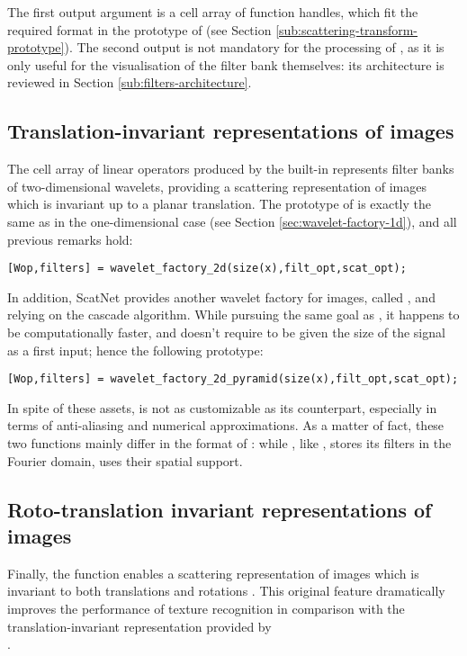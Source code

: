 \documentclass{article}
\begin{document}
The first output argument is a cell array of function handles, which fit the required format in the prototype of  (see Section \ref{sub:scattering-transform-prototype}). The second output is not mandatory for the processing of , as it is only useful for the visualisation of the filter bank themselves: its architecture is reviewed in Section \ref{sub:filters-architecture}.

\subsection{Translation-invariant representations of images \label{sub:wavelet-factory-2d}}

The cell array of linear operators produced by the  built-in represents filter banks of two-dimensional wavelets, providing a scattering representation of images which is invariant up to a planar translation. The prototype of  is exactly the same as in the one-dimensional case (see Section \ref{sec:wavelet-factory-1d}), and all previous remarks hold: 

\begin{lstlisting}
[Wop,filters] = wavelet_factory_2d(size(x),filt_opt,scat_opt);
\end{lstlisting}

In addition, ScatNet provides another wavelet factory for images, called , and relying on the cascade algorithm.  While pursuing the same goal as , it happens to be computationally faster, and doesn't require to be given the size of the signal  as a first input; hence the following prototype:

\begin{lstlisting}
[Wop,filters] = wavelet_factory_2d_pyramid(size(x),filt_opt,scat_opt);
\end{lstlisting}

In spite of these assets,  is not as customizable as its counterpart, especially in terms of anti-aliasing and numerical approximations. As a matter of fact, these two functions mainly differ in the format of  : while , like , stores its filters in the Fourier domain,  uses their spatial support.

\subsection{Roto-translation invariant representations of images}
Finally, the function  enables a scattering representation of images which is invariant to both translations and rotations \cite{sifre13}. This original feature dramatically improves the performance of texture recognition in comparison with the translation-invariant representation provided by \\
. 
\end{document}
